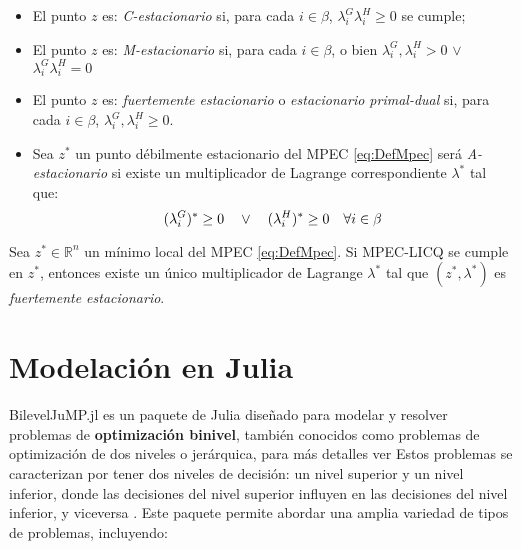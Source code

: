 \begin{itemize}
\item \begin{definition}
  El punto $z$ es: \textit{C-estacionario} si, para cada $i \in \beta$, $\lambda_i^G\lambda_i^H \geq 0$ se cumple;
\end{definition}
\item \begin{definition}
    El punto $z$ es: \textit{M-estacionario} si, para cada $i \in \beta$, o bien $\lambda_i^G,\lambda_i^H > 0$ $\vee$ $\lambda_i^G \lambda_i^H = 0$
\end{definition}
\item \begin{definition}
    El punto $z$ es: \textit{fuertemente estacionario} o \textit{estacionario primal-dual} si, para cada $i \in \beta$, $\lambda_i^G, \lambda_i^H \geq 0$.
\end{definition}
\item \begin{definition}
   Sea $z^*$ un punto débilmente estacionario del MPEC \eqref{eq:DefMpec} será \textit{A-estacionario} si existe un multiplicador de Lagrange correspondiente $\lambda^*$ tal que:
\begin{equation}
(\lambda_i^G)^* \geq 0 \quad \vee \quad (\lambda_i^H)^* \geq 0 \quad \forall i \in \beta \notag
\end{equation}
\end{definition}
\end{itemize}


\begin{theorem} 
Sea $z^* \in \mathbb{R}^n$ un mínimo local del MPEC \eqref{eq:DefMpec}. Si MPEC-LICQ se cumple en $z^*$, entonces existe un único multiplicador de Lagrange $\lambda^*$ tal que $(z^*, \lambda^*)$ es \textit{fuertemente estacionario}.
\end{theorem}

\section{Modelación en Julia}
BilevelJuMP.jl es un paquete de Julia diseñado para modelar y resolver problemas de \textbf{optimización binivel}, también conocidos como problemas de optimización de dos niveles o jerárquica, para más detalles ver \cite{BilevelJump}
Estos problemas se caracterizan por tener dos niveles de decisión: un nivel superior y un nivel inferior, donde las decisiones del nivel superior influyen en las decisiones del nivel inferior, y viceversa \cite{BilevelJump}.
Este paquete permite abordar una amplia variedad de tipos de problemas, incluyendo:

